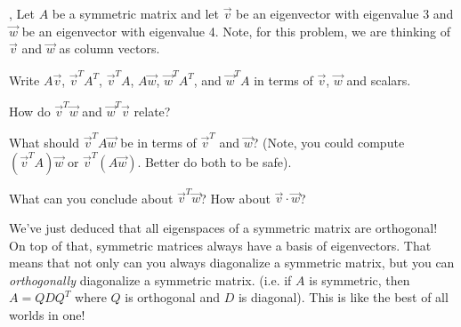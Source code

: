 \documentclass{article}
\begin{document}
	\sep
	Let $A$ be a symmetric matrix and let $\vec v$ be an eigenvector with eigenvalue
	3 and $\vec w$ be an eigenvector with eigenvalue 4.  Note, for this problem,
	we are thinking of $\vec v$ and $\vec w$ as column vectors.
	\begin{Enum}
		\item Write $A\vec v$, $\vec v^TA^T$, $\vec v^TA$, $A\vec w$, $\vec w^TA^T$, 
		and $\vec w^TA$ in terms of $\vec v$, $\vec w$ and scalars.
		\item How do $\vec v^T\vec w$ and $\vec w^T\vec v$ relate?
		\item What should $\vec v^TA\vec w$ be in terms of $\vec v^T$ and
			$\vec w$? (Note, you could compute $(\vec v^TA)\vec w$
			or $\vec v^T(A\vec w)$.  Better do both to be safe).
		\item What can you conclude about $\vec v^T\vec w$?  How about
			$\vec v\cdot \vec w$?
	\end{Enum}

	We've just deduced that all eigenspaces of a symmetric matrix are orthogonal! On
	top of that, symmetric matrices always have a basis of eigenvectors.  That means
	that not only can you always diagonalize a symmetric matrix, but you can 
	\emph{orthogonally} diagonalize a symmetric matrix. (i.e. if $A$ is symmetric,
	then $A=QDQ^T$ where $Q$ is orthogonal and $D$ is diagonal).  This is like the 
	best of all worlds in one!
\end{document}
